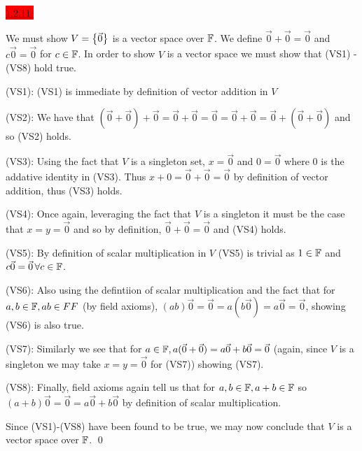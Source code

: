\documentclass{exam}
\begin{document}
  \colorbox{red}{\underline{1.2.11:}}
  \begin{solution}
    We must show $V = \left\{\vec{0} \right\}$ is a vector space over $\mathbb F$. We define $\vec{0} + \vec{0} = \vec{0}$ and $c\vec{0} = \vec{0}$ for $c \in \mathbb F$. In order to show $V$ is a vector space we must show that (VS1) - (VS8) hold true. 

    \hspace{0.5cm}(VS1): (VS1) is immediate by definition of vector addition in $V$ 

    \hspace{0.5cm}(VS2): We have that $(\vec{0} + \vec{0}) + \vec{0} = \vec{0} + \vec{0} = \vec{0} = \vec{0} + \vec{0} = \vec{0} + (\vec{0} + \vec{0})$ and so (VS2) holds.

    \hspace{0.5cm}(VS3): Using the fact that $V$ is a singleton set, $x = \vec{0}$ and $\mathit{0} = \vec{0}$ where $\mathit{0}$ is the addative identity in (VS3). Thus $x + \mathit{0} = \vec{0} + \vec{0} = \vec{0}$ by definition of vector addition, thus (VS3) holds.

    \hspace{0.5cm}(VS4): Once again, leveraging the fact that $V$ is a singleton it must be the case that $x = y = \vec{0}$ and so by definition, $\vec{0} + \vec{0} = \vec{0}$ and (VS4) holds.

    \hspace{0.5cm}(VS5): By definition of scalar multiplication in $V$ (VS5) is trivial as $1 \in \mathbb F$ and $c\vec{0} = \vec{0} \,\forall c \in \mathbb F$.

    \hspace{0.5cm}(VS6): Also using the defintiion of scalar multiplication and the fact that for $a, b \in \mathbb F, ab \in FF$ (by field axioms), $(ab)\vec{0} = \vec{0} = a(b\vec{0}) = a\vec{0} = \vec{0}$, showing (VS6) is also true.

    \hspace{0.5cm}(VS7): Similarly we see that for $a \in \mathbb F, a(\vec{0} + \vec{0}) = a\vec{0} + b\vec{0} = \vec{0}$ (again, since $V$ is a singleton we may take $x = y = \vec{0}$ for (VS7)) showing (VS7).

    \hspace{0.5cm}(VS8): Finally, field axioms again tell us that for $a, b \in \mathbb F, a + b \in \mathbb F$  so $(a + b)\vec{0} = \vec{0} = a\vec{0} + b\vec{0}$ by definition of scalar multiplication. 

    Since (VS1)-(VS8) have been found to be true, we may now conclude that $V$ is a vector space over $\mathbb F$. \qed
  \end{solution}
\end{document}
